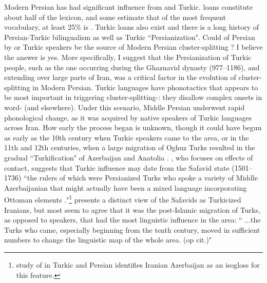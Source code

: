 \documentclass[output=paper,
modfonts
]{LSP/langsci}
\begin{document}
Modern Persian  has had significant influence from  and
Turkic.  loans constitute about half of the lexicon, and some
estimate that of the most frequent vocabulary, at least 25\% is 
\citep{perry2004a, perry2005a}. Turkic loans also exist and there is a long history
of Persian-Turkic bilingualism as well as Turkic ``Persianization". Could
 of Persian by  or Turkic speakers be the source of
Modern Persian cluster-splitting ? I believe the answer is
yes. More specifically, I suggest that the Persianization of Turkic
people, such as the one occurring during the Ghaznavid dynasty
(977--1186), and extending over large parts of Iran, was a critical
factor in the evolution of cluster-splitting  in Modern
Persian. Turkic languages have phonotactics that appears to be most
important in triggering cluster-splitting-: they disallow
complex onsets in word- (and elsewhere). Under this
scenario, Middle Persian underwent rapid phonological change, as it was
acquired by native speakers of Turkic languages across Iran. How early
the process began is unknown, though it could have begun as early as the
10th century when Turkic speakers came to the area, or in the 11th and
12th centuries, when a large migration of Oghuz Turks resulted in the
gradual ``Turkification" of Azerbaijan and Anatolia \citep{frye2004a}. \citet{key2012a}, who focuses on  effects of contact, suggests that
Turkic influence may date from the Safavid state (1501--1736) ``the rulers
of which were Persianized Turks who spoke a variety of Middle
Azerbaijanian that might actually have been a mixed language
incorporating Ottoman elements \citep[228]{stein2005a}."\footnote{
  study of  in Turkic and Persian identifies
  Iranian Azerbaijan as an isogloss for this feature.} \citet{frye2004a}
presents a distinct view of the Safavids as Turkicized Iranians, but
most seem to agree that it was the post-Islamic migration of Turks, as
opposed to  speakers, that had the most linguistic influence in
the area: `` ...the Turks who came, especially beginning from the tenth
century, moved in sufficient numbers to change the linguistic map of the
whole area. (op cit.)"
\end{document}
